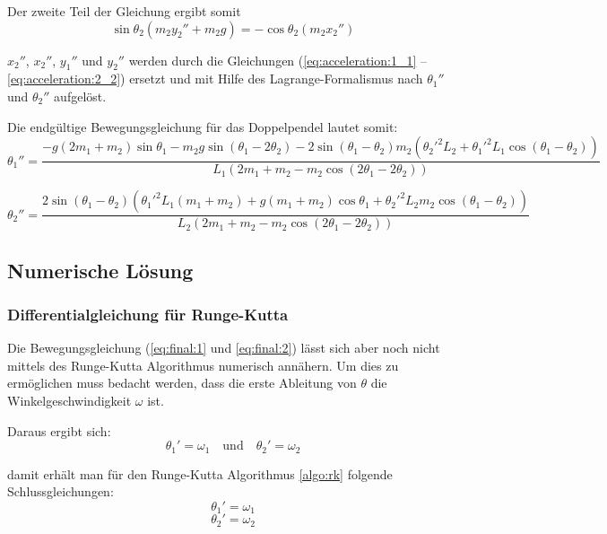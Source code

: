 \documentclass[12pt]{article}
\numberwithin{equation}{subsection}
\begin{document}
Der zweite Teil der Gleichung ergibt somit
\begin{equation} \label{eq:motion:2}
	\sin\theta_2(m_2 y_2'' + m_2 g) = -\cos\theta_2(m_2 x_2'')
\end{equation}

$x_2''$, $x_2''$, $y_1''$ und $y_2''$ werden durch die Gleichungen (\ref{eq:acceleration:1_1} – \ref{eq:acceleration:2_2}) ersetzt und mit Hilfe des Lagrange-Formalismus nach $\theta_1''$ und $\theta_2''$ aufgelöst.

Die endgültige Bewegungsgleichung für das Doppelpendel lautet somit:
\begin{equation} \label{eq:final:1}
	\theta_1'' = \frac{-g(2m_1+m_2)\sin\theta_1 - m_2 g \sin(\theta_1 - 2\theta_2) -2\sin(\theta_1 - \theta_2)m_2({\theta_2'}^2 L_2 + {\theta_1'}^2 L_1\cos(\theta_1 - \theta_2))}
	{L_1(2m_1 + m_2 - m_2 \cos(2\theta_1 - 2\theta_2))}
\end{equation}

\begin{equation} \label{eq:final:2}
	\theta_2'' = \frac{2\sin(\theta_1 - \theta_2)({\theta_1'}^2 L_1(m_1 + m_2) + g(m_1 + m_2)\cos\theta_1 + {\theta_2'}^2 L_2 m_2 \cos(\theta_1 - \theta_2))}
	{L_2 (2m_1 + m_2 - m_2 \cos(2 \theta_1 - 2\theta_2))}
\end{equation}

\subsection{Numerische Lösung}
\subsubsection{Differentialgleichung für Runge-Kutta}
Die Bewegungsgleichung (\ref{eq:final:1} und \ref{eq:final:2}) lässt sich aber noch nicht mittels des Runge-Kutta Algorithmus numerisch annähern. Um dies zu ermöglichen muss bedacht werden, dass die erste Ableitung von $\theta$ die Winkelgeschwindigkeit $\omega$ ist.

Daraus ergibt sich:
\begin{equation*}
	\theta_1' = \omega_1 \quad \text{und} \quad \theta_2' = \omega_2
\end{equation*}

damit erhält man für den Runge-Kutta Algorithmus \ref{algo:rk} folgende Schlussgleichungen:
\begin{equation} \label{eq:rk:1}
	\theta_1' = \omega_1
\end{equation}
\begin{equation} \label{eq:rk:2}
	\theta_2' = \omega_2
\end{equation}
\end{document}
